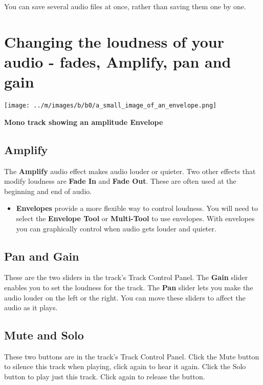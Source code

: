 \documentclass[twocolumn]{book}
\begin{document}
You can save several audio files at once, rather than saving them one by one.



\section{Changing the loudness of your audio - fades, Amplify, pan and gain}

\par\texttt{[image: ../m/images/b/b0/a\_small\_image\_of\_an\_envelope.png]}\par\textbf{Mono track showing an amplitude Envelope}

\subsection{Amplify}


The \textbf{Amplify} audio effect makes audio louder or quieter.  Two other effects that modify loudness are \textbf{Fade In} and \textbf{Fade Out}.  These are often used at the beginning and end of audio. 
\begin{itemize}
\item  \textbf{Envelopes} provide a more flexible way to control loudness.  You will need to select the \textbf{Envelope Tool} or \textbf{Multi-Tool} to use envelopes.  With envelopes you can graphically control when audio gets louder and quieter.
\end{itemize}

\subsection{Pan and Gain}


These are the two sliders in the track's Track Control Panel. The \textbf{Gain} slider enables you to set the loudness for the track.  The \textbf{Pan} slider lets you make the audio louder on the left or the right. You can move these sliders to affect the audio as it plays.

\subsection{Mute and Solo}


These two buttons are in the track's Track Control Panel. Click the Mute button to silence this track when playing, click again to hear it again. Click the Solo button to play just this track. Click again to release the button. 
\end{document}
